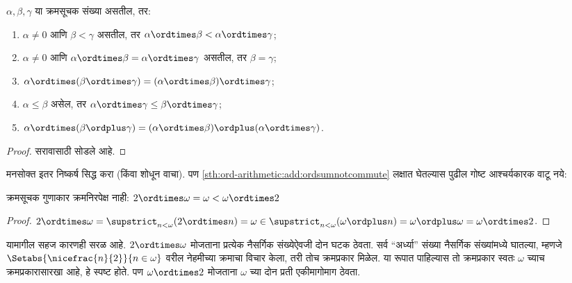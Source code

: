 \begin{lem}\label{sth:ord-arithmetic:mult:ordinalmultiplicationisnice}
$\alpha, \beta, \gamma$ या क्रमसूचक संख्या असतील, तर:
\begin{enumerate}
  \item\label{sth:ord-arithmetic:mult:ordtimes1} $\alpha \neq 0$ आणि $\beta < \gamma$ असतील,
  तर $\alpha \ordtimes \beta < \alpha \ordtimes \gamma$;
  \item\label{sth:ord-arithmetic:mult:ordtimes2} $\alpha \neq 0$ आणि $\alpha \ordtimes
  \beta = \alpha\ordtimes\gamma$ असतील, तर $\beta = \gamma$;
  \item\label{sth:ord-arithmetic:mult:ordtimes3} $\alpha \ordtimes (\beta \ordtimes
  \gamma) = (\alpha \ordtimes \beta) \ordtimes \gamma$;
  \item\label{sth:ord-arithmetic:mult:ordtimes4} $\alpha \leq \beta$ असेल, तर $\alpha
  \ordtimes \gamma \leq \beta \ordtimes \gamma$;
  \item\label{sth:ord-arithmetic:mult:ordtimes5} $\alpha \ordtimes (\beta \ordplus
  \gamma) = (\alpha \ordtimes \beta )\ordplus (\alpha\ordtimes
  \gamma)$.
\end{enumerate}
\end{lem}

\begin{proof}
सरावासाठी सोडले आहे.
\end{proof}

मनसोक्त इतर निष्कर्ष सिद्ध करा (किंवा शोधून वाचा). पण \ref{sth:ord-arithmetic:add:ordsumnotcommute} लक्षात घेतल्यास पुढील गोष्ट आश्चर्यकारक वाटू नये:

\begin{prop}
क्रमसूचक गुणाकार क्रमनिरपेक्ष नाही: $2 \ordtimes \omega  =
\omega < \omega \ordtimes 2$
\end{prop}

\begin{proof}
$2 \ordtimes \omega = \supstrict_{n < \omega}(2\ordtimes  n) = \omega \in \supstrict_{n < \omega}(\omega \ordplus n) = \omega \ordplus \omega = \omega \ordtimes 2$.
\end{proof}
\noindent
यामागील सहज कारणही सरळ आहे. $2
\ordtimes \omega$ मोजताना प्रत्येक नैसर्गिक संख्येऐवजी दोन घटक ठेवता. सर्व “अर्ध्या” संख्या नैसर्गिक संख्यांमध्ये घातल्या, म्हणजे $\Setabs{\nicefrac{n}{2}}{n \in \omega}$ वरील नेहमीच्या क्रमाचा विचार केला, तरी तोच क्रमप्रकार मिळेल. या रूपात पाहिल्यास तो क्रमप्रकार स्वतः $\omega$ च्याच क्रमप्रकारासारखा आहे, हे स्पष्ट होते. पण $\omega \ordtimes 2$ मोजताना $\omega$ च्या दोन प्रती एकीमागोमाग ठेवता.

